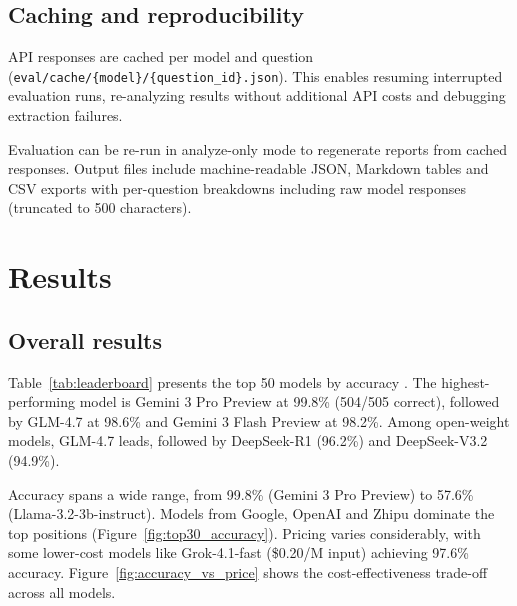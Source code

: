 \documentclass[11pt]{article}
\begin{document}

\subsection{Caching and reproducibility}

API responses are cached per model and question
({\small\texttt{eval/\allowbreak{}cache/\allowbreak{}\{model\}/\allowbreak{}\{question\_id\}.json}}). This enables resuming interrupted evaluation runs, re-analyzing results without additional API costs and debugging extraction failures.

Evaluation can be re-run in analyze-only mode to regenerate reports from cached responses. Output files include machine-readable JSON, Markdown tables and CSV exports with per-question breakdowns including raw model responses (truncated to 500 characters).


\section{Results}

\subsection{Overall results}

Table~\ref{tab:leaderboard} presents the top 50 models by accuracy \cite{formationeval_leaderboard}. The highest-performing model is Gemini 3 Pro Preview at 99.8\% (504/505 correct), followed by GLM-4.7 at 98.6\% and Gemini 3 Flash Preview at 98.2\%. Among open-weight models, GLM-4.7 leads, followed by DeepSeek-R1 (96.2\%) and DeepSeek-V3.2 (94.9\%).

Accuracy spans a wide range, from 99.8\% (Gemini 3 Pro Preview) to 57.6\% (Llama-3.2-3b-instruct). Models from Google, OpenAI and Zhipu dominate the top positions (Figure~\ref{fig:top30_accuracy}). Pricing varies considerably, with some lower-cost models like Grok-4.1-fast (\$0.20/M input) achieving 97.6\% accuracy. Figure~\ref{fig:accuracy_vs_price} shows the cost-effectiveness trade-off across all models.

\end{document}
